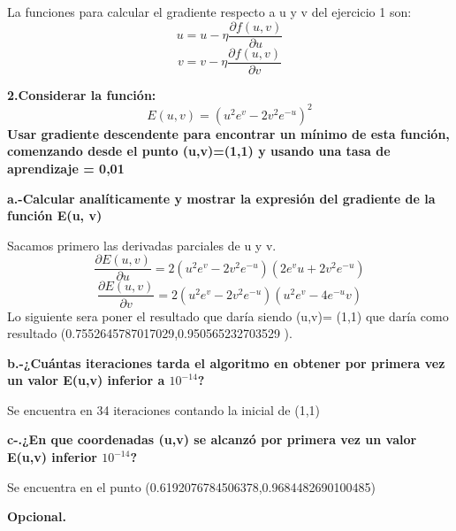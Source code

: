 \documentclass[titlepage]{article}
\begin{document}
 	La funciones para calcular el gradiente respecto a u y v del ejercicio 1 son:
 	\begin{equation}
 	u = u - \eta\frac{\partial f(u,v)}{\partial u}
 	\end{equation}
 	\begin{equation}
 	v = v - \eta\frac{\partial f(u,v)}{\partial v}
 	\end{equation}
 	

 	
 	
 	
 	
 \newpage

\newpage
	\textbf{2.Considerar la función:}
	\begin{equation}
	E(u,v) = (u^2e^v-2v^2e^{-u})^2
	\end{equation}
	\textbf{Usar gradiente descendente para encontrar un mínimo de esta función, comenzando desde el punto (u,v)=(1,1) y usando una tasa de aprendizaje = 0,01}
	
	\textbf{a.-Calcular analíticamente y mostrar la expresión del gradiente de la función E(u, v)}
	\newline
	
	Sacamos primero las derivadas parciales de u y v.
	\begin{equation}
	\frac{\partial E(u,v)}{\partial u} = 2(u^2e^v-2v^2e^{-u})(2e^vu + 2v^2e^{-u})
	\end{equation}
	\begin{equation}
	\frac{\partial E(u,v)}{\partial v} = 2(u^2e^v-2v^2e^{-u})(u^2e^v-4e^{-u}v)
	\end{equation}
	Lo siguiente sera poner el resultado que daría siendo (u,v)= (1,1)
	que daría como resultado (0.7552645787017029,0.950565232703529 ).
	\newline

	\textbf{b.-¿Cuántas iteraciones tarda el algoritmo en obtener por primera vez un valor E(u,v) inferior a $ 10^{-14}$?}	
	\newline
	
	Se encuentra en 34 iteraciones contando la inicial de (1,1)
	\newline
	
	\textbf{c-.¿En que coordenadas (u,v) se alcanzó por primera vez un valor E(u,v) inferior $10^{-14}$?}
	\newline
	
	Se encuentra en el punto (0.6192076784506378,0.9684482690100485)
	\newline
	
	\textbf{Opcional.}
	\newline
	
\end{document}
